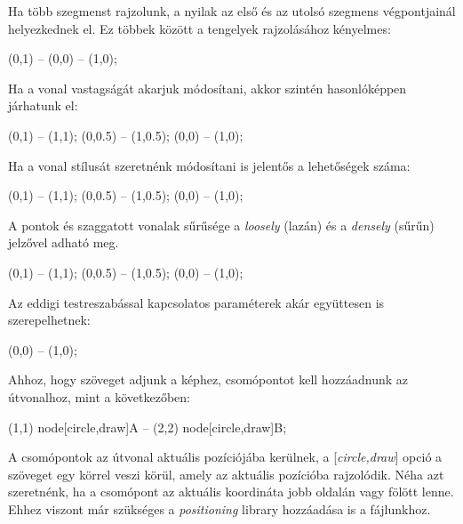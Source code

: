 \noindent
Ha több szegmenst rajzolunk, a nyilak az első és az utolsó szegmens végpontjainál helyezkednek el. Ez többek között a tengelyek rajzolásához kényelmes:

\begin{tikzcode}
\draw [<->] (0,1) -- (0,0) -- (1,0);
\end{tikzcode}

\noindent
Ha a vonal vastagságát akarjuk módosítani, akkor szintén hasonlóképpen járhatunk el:

\begin{tikzcode}
\draw [thin] (0,1) -- (1,1);
\draw [thick] (0,0.5) -- (1,0.5);	
 (0,0) -- (1,0);
\end{tikzcode}

\noindent
Ha a vonal stílusát szeretnénk módosítani is jelentős a lehetőségek száma:

\begin{tikzcode}
\draw [dotted] (0,1) -- (1,1);
\draw [dashed] (0,0.5) -- (1,0.5);	
\draw [dashdotted] (0,0) -- (1,0);
\end{tikzcode}

\noindent
A pontok és szaggatott vonalak sűrűsége a \textit{loosely} (lazán) és a \textit{densely} (sűrűn) jelzővel adható meg.
\begin{tikzcode}
\draw [dashed] (0,1) -- (1,1);
 (0,0.5) -- (1,0.5);	
 (0,0) -- (1,0);
\end{tikzcode}

\noindent
Az eddigi testreszabással kapcsolatos paraméterek akár együttesen is szerepelhetnek:

\begin{tikzcode}
 (0,0) -- (1,0);
\end{tikzcode}

\noindent
Ahhoz, hogy szöveget adjunk a képhez, csomópontot kell hozzáadnunk az útvonalhoz, mint a következőben:

\begin{tikzcode}
\draw 
	(1,1) node[circle,draw]{A} 
	-- 
	(2,2) node[circle,draw]{B};	
\end{tikzcode}

\noindent
A csomópontok az útvonal aktuális pozíciójába kerülnek, a [\textit{circle,draw}] opció a szöveget egy körrel veszi körül, amely az aktuális pozícióba rajzolódik.
Néha azt szeretnénk, ha a csomópont az aktuális koordináta jobb oldalán vagy fölött lenne. Ehhez viszont már szükséges a \textit{positioning} library hozzáadása is a fájlunkhoz.

